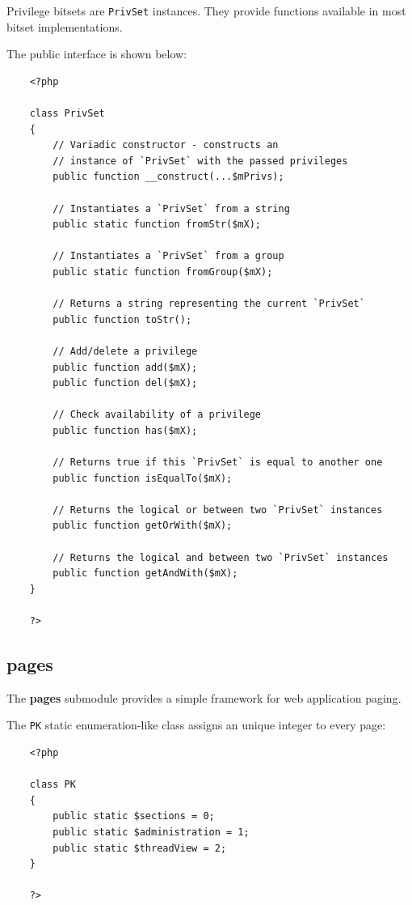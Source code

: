 \documentclass[12pt]{report}
\renewcommand\emph{\textbf}
\begin{document}
                    Privilege bitsets are \texttt{PrivSet} instances. They provide functions available in most bitset implementations.

                    The public interface is shown below:
 
                    \begin{verbatim}
    <?php

    class PrivSet
    {
        // Variadic constructor - constructs an
        // instance of `PrivSet` with the passed privileges
        public function __construct(...$mPrivs);

        // Instantiates a `PrivSet` from a string
        public static function fromStr($mX);

        // Instantiates a `PrivSet` from a group
        public static function fromGroup($mX);

        // Returns a string representing the current `PrivSet`
        public function toStr();

        // Add/delete a privilege
        public function add($mX);
        public function del($mX);

        // Check availability of a privilege
        public function has($mX);

        // Returns true if this `PrivSet` is equal to another one
        public function isEqualTo($mX);

        // Returns the logical or between two `PrivSet` instances
        public function getOrWith($mX);

        // Returns the logical and between two `PrivSet` instances
        public function getAndWith($mX);
    }

    ?>                        
                    \end{verbatim}

                \subsection{pages}

                    The \emph{pages} submodule provides a simple framework for web application paging.

                    The \texttt{PK} static enumeration-like class assigns an unique integer to every page:

                    \begin{verbatim}
    <?php

    class PK
    {
        public static $sections = 0;
        public static $administration = 1;
        public static $threadView = 2;
    }

    ?>
                    \end{verbatim}
\end{document}
